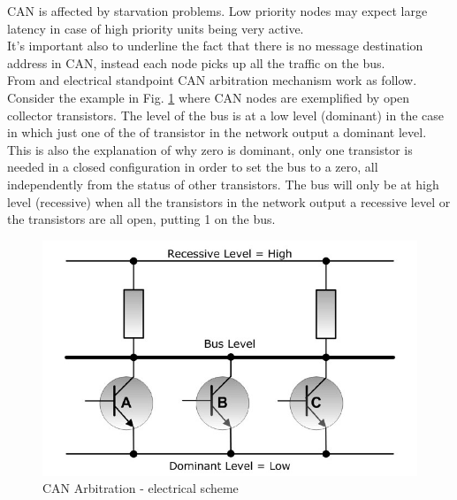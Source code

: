 \documentclass[../main.tex]{subfiles}
\begin{document}
\gls{CAN} is affected by starvation problems. Low priority nodes may expect large latency in case of high priority units being very active. \\
It's important also to underline the fact that there is no message destination address in \gls{CAN}, instead each node picks up all the traffic on the bus.\\
From and electrical standpoint \gls{CAN} arbitration mechanism work as follow. Consider the example in Fig. \ref{fig:CANABRELT} where \gls{CAN} nodes are exemplified by open collector transistors. 
The level of the bus is at a low level (dominant) in the case in which just one of the of transistor in the network output a dominant level. This is also the explanation of why zero is dominant, only one transistor is needed in a closed configuration in order to set the \gls{bus} to a zero, all independently from the status of other transistors. The \gls{bus} will only be at high level (recessive) when all the transistors in the network output a recessive level or the transistors are all open, putting 1 on the \gls{bus}.
\begin{figure}[ht]
    \centering
    \includegraphics[width=0.7\linewidth]{images_folder/controller-area-network-can-bus-bus-arbitration-3.jpg}
    \caption{CAN Arbitration -  electrical scheme}
    \label{fig:CANABRELT}
\end{figure}



\cleardoublepage
\end{document}
